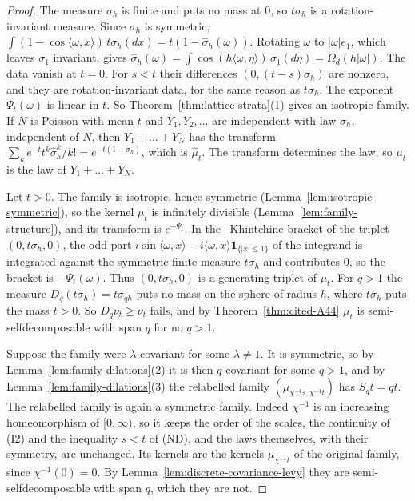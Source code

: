 \begin{proof}
The measure $\sigma_h$ is finite and puts no mass at $0$, so $t\sigma_h$ is a rotation-invariant
\Levy{} measure. Since $\sigma_h$ is symmetric,
$\int(1 - \cos\langle\omega, x\rangle)\,t\sigma_h(dx) = t(1 - \widehat\sigma_h(\omega))$. Rotating
$\omega$ to $|\omega|e_1$, which leaves $\sigma_1$ invariant, gives
$\widehat\sigma_h(\omega) = \int\cos(h\langle\omega, \eta\rangle)\,\sigma_1(d\eta) = \Omega_d(h|\omega|)$.
The data vanish at $t = 0$. For $s < t$ their differences $(0, (t - s)\sigma_h)$ are nonzero, and
they are rotation-invariant \Levy{} data, for the same reason as $t\sigma_h$. The exponent
$\Psi_t(\omega)$ is linear in $t$. So Theorem~\ref{thm:lattice-strata}(1) gives an isotropic family.
If $N$ is Poisson with mean $t$ and $Y_1, Y_2, \dots$ are independent with law $\sigma_h$, independent
of $N$, then $Y_1 + \dots + Y_N$ has the transform
$\sum_ke^{-t}t^k\widehat\sigma_h^k/k! = e^{-t(1 - \widehat\sigma_h)}$, which is $\widehat\mu_t$. The
transform determines the law, so $\mu_t$ is the law of $Y_1 + \dots + Y_N$.

Let $t > 0$. The family is isotropic, hence symmetric (Lemma~\ref{lem:isotropic-symmetric}), so
the kernel $\mu_t$ is infinitely divisible (Lemma~\ref{lem:family-structure}), and its transform is
$e^{-\Psi_t}$. In the \Levy--Khintchine bracket of the triplet $(0, t\sigma_h, 0)$, the odd part $i\sin\langle\omega, x\rangle - i\langle\omega, x\rangle
\mathbf 1_{\{|x| \le 1\}}$ of the integrand is integrated against the symmetric finite measure
$t\sigma_h$ and contributes $0$, so the bracket is $-\Psi_t(\omega)$. Thus $(0, t\sigma_h, 0)$ is a
generating triplet of $\mu_t$. For $q > 1$ the measure $D_q(t\sigma_h) = t\sigma_{qh}$ puts no mass on
the sphere of radius $h$, where $t\sigma_h$ puts the mass $t > 0$. So $D_q\nu_t \ge \nu_t$ fails,
and by Theorem~\ref{thm:cited-A44} $\mu_t$ is semi-selfdecomposable with span $q$ for no $q > 1$.

Suppose the family were $\lambda$-covariant for some $\lambda \ne 1$. It is symmetric, so by
Lemma~\ref{lem:family-dilations}(2) it is then $q$-covariant for some $q > 1$, and by
Lemma~\ref{lem:family-dilations}(3) the relabelled family $(\mu_{\chi^{-1}s,\chi^{-1}t})$ has
$S_qt = qt$. The relabelled family is again a symmetric family. Indeed $\chi^{-1}$ is an increasing
homeomorphism of $[0,\infty)$, so it keeps the order of the scales, the continuity of (I2) and the
inequality $s < t$ of (ND), and the laws themselves, with their symmetry, are unchanged. Its
kernels are the kernels $\mu_{\chi^{-1}t}$ of the original family, since $\chi^{-1}(0) = 0$. By
Lemma~\ref{lem:discrete-covariance-levy} they are semi-selfdecomposable with span $q$, which they
are not.
\end{proof}

